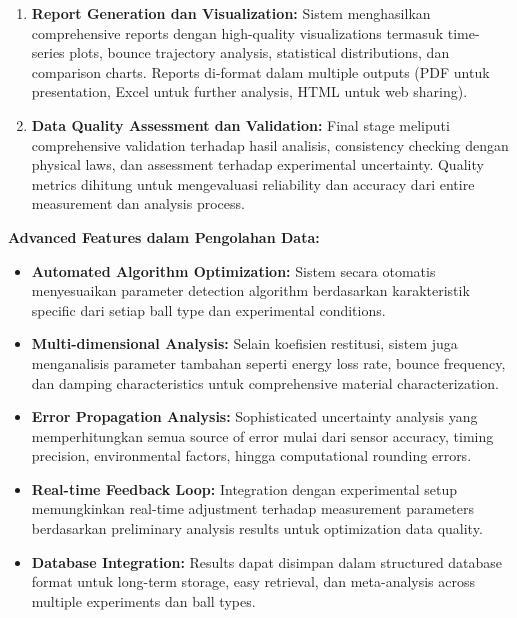 \documentclass[a4paper,10pt]{article}
\begin{document}
\begin{enumerate}
\item \textbf{Report Generation dan Visualization:} Sistem menghasilkan comprehensive reports dengan high-quality visualizations termasuk time-series plots, bounce trajectory analysis, statistical distributions, dan comparison charts. Reports di-format dalam multiple outputs (PDF untuk presentation, Excel untuk further analysis, HTML untuk web sharing).

\item \textbf{Data Quality Assessment dan Validation:} Final stage meliputi comprehensive validation terhadap hasil analisis, consistency checking dengan physical laws, dan assessment terhadap experimental uncertainty. Quality metrics dihitung untuk mengevaluasi reliability dan accuracy dari entire measurement dan analysis process.
\end{enumerate}

\textbf{Advanced Features dalam Pengolahan Data:}

\begin{itemize}
\item \textbf{Automated Algorithm Optimization:} Sistem secara otomatis menyesuaikan parameter detection algorithm berdasarkan karakteristik specific dari setiap ball type dan experimental conditions.

\item \textbf{Multi-dimensional Analysis:} Selain koefisien restitusi, sistem juga menganalisis parameter tambahan seperti energy loss rate, bounce frequency, dan damping characteristics untuk comprehensive material characterization.

\item \textbf{Error Propagation Analysis:} Sophisticated uncertainty analysis yang memperhitungkan semua source of error mulai dari sensor accuracy, timing precision, environmental factors, hingga computational rounding errors.

\item \textbf{Real-time Feedback Loop:} Integration dengan experimental setup memungkinkan real-time adjustment terhadap measurement parameters berdasarkan preliminary analysis results untuk optimization data quality.

\item \textbf{Database Integration:} Results dapat disimpan dalam structured database format untuk long-term storage, easy retrieval, dan meta-analysis across multiple experiments dan ball types.
\end{itemize}
\end{document}
